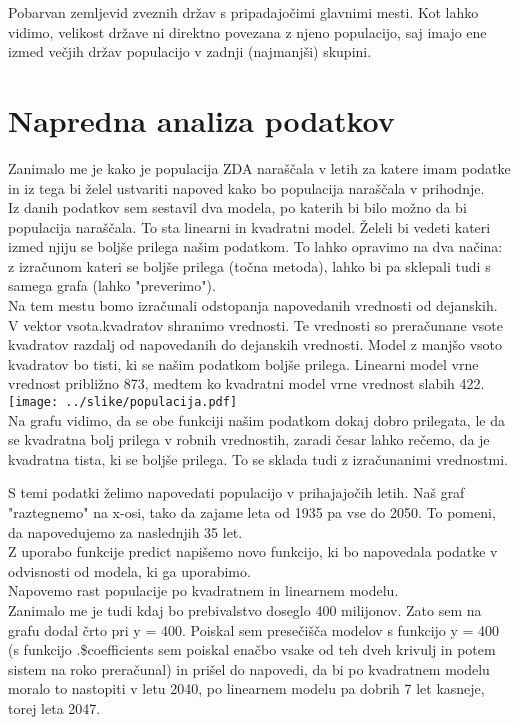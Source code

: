 \documentclass[11pt,a4paper]{article}
\begin{document}

Pobarvan zemljevid zveznih držav s pripadajočimi glavnimi mesti. Kot lahko vidimo, velikost države ni direktno povezana z njeno populacijo, saj imajo ene izmed večjih držav populacijo v zadnji (najmanjši) skupini.

\pagebreak
\section{Napredna analiza podatkov}

Zanimalo me je kako je populacija ZDA naraščala v letih za katere imam podatke in iz tega bi želel ustvariti napoved kako bo populacija naraščala v prihodnje. \\
Iz danih podatkov sem sestavil dva modela, po katerih bi bilo možno da bi populacija naraščala. To sta linearni in kvadratni model. Želeli bi vedeti kateri izmed njiju se boljše prilega našim podatkom. To lahko opravimo na dva načina: z izračunom kateri se boljše prilega (točna metoda), lahko bi pa sklepali tudi s samega grafa (lahko "preverimo").\\
Na tem mestu bomo izračunali odstopanja napovedanih vrednosti od dejanskih. V vektor vsota.kvadratov shranimo vrednosti. Te vrednosti so preračunane vsote kvadratov razdalj od napovedanih do dejanskih vrednosti. Model z manjšo vsoto kvadratov bo tisti, ki se našim podatkom boljše prilega. Linearni model vrne vrednost približno 873, medtem ko kvadratni model vrne vrednost slabih 422.  \\


\texttt{[image: ../slike/populacija.pdf]}\\

Na grafu vidimo, da se obe funkciji našim podatkom dokaj dobro prilegata, le da se kvadratna bolj prilega v robnih vrednostih, zaradi česar lahko rečemo, da je kvadratna tista, ki se boljše prilega. To se sklada tudi z izračunanimi vrednostmi.
\pagebreak

S temi podatki želimo napovedati populacijo v prihajajočih letih. Naš graf "raztegnemo" na x-osi, tako da zajame leta od 1935 pa vse do 2050. To pomeni, da napovedujemo za naslednjih 35 let. \\
Z uporabo funkcije predict napišemo novo funkcijo, ki bo napovedala podatke v odvisnosti od modela, ki ga uporabimo.\\
Napovemo rast populacije po kvadratnem in linearnem modelu.\\
Zanimalo me je tudi kdaj bo prebivalstvo doseglo 400 milijonov. Zato sem na grafu dodal črto pri y = 400. Poiskal sem presečišča modelov s funkcijo y = 400 (s funkcijo 
.\$coefficients sem poiskal enačbo vsake od teh dveh krivulj in potem sistem na roko preračunal) in prišel do napovedi, da bi po kvadratnem modelu moralo to nastopiti v letu 2040, po linearnem modelu pa dobrih 7 let kasneje, torej leta 2047. \\
\end{document}
